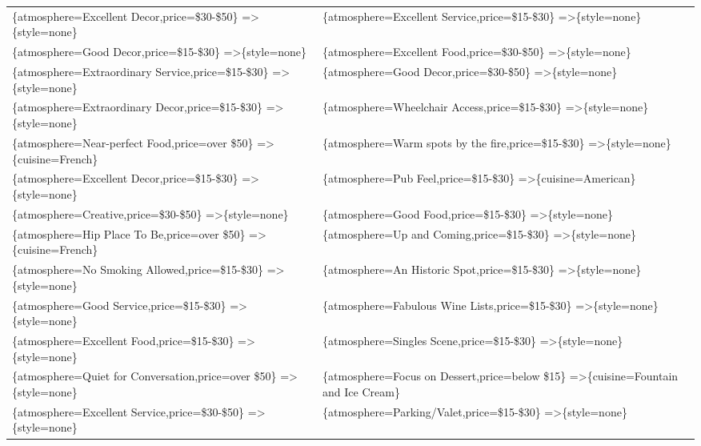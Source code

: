 \documentclass[letterpaper,10pt]{article}
\begin{document}
\begin{appendices}
\begin{table}[h]
\begin{adjustbox}{max width=\textwidth}
\begin{tabular}{ll}
\{atmosphere=Excellent Decor,price=\$30-\$50\} =\textgreater \{style=none\} & \{atmosphere=Excellent Service,price=\$15-\$30\} =\textgreater \{style=none\} \\ 
\{atmosphere=Good Decor,price=\$15-\$30\} =\textgreater \{style=none\} & \{atmosphere=Excellent Food,price=\$30-\$50\} =\textgreater \{style=none\} \\ 
\{atmosphere=Extraordinary Service,price=\$15-\$30\} =\textgreater \{style=none\} & \{atmosphere=Good Decor,price=\$30-\$50\} =\textgreater \{style=none\} \\ 
\{atmosphere=Extraordinary Decor,price=\$15-\$30\} =\textgreater \{style=none\} & \{atmosphere=Wheelchair Access,price=\$15-\$30\} =\textgreater \{style=none\} \\ 
\{atmosphere=Near-perfect Food,price=over \$50\} =\textgreater \{cuisine=French\} & \{atmosphere=Warm spots by the fire,price=\$15-\$30\} =\textgreater \{style=none\} \\ 
\{atmosphere=Excellent Decor,price=\$15-\$30\} =\textgreater \{style=none\} & \{atmosphere=Pub Feel,price=\$15-\$30\} =\textgreater \{cuisine=American\} \\ 
\{atmosphere=Creative,price=\$30-\$50\} =\textgreater \{style=none\} & \{atmosphere=Good Food,price=\$15-\$30\} =\textgreater \{style=none\} \\ 
\{atmosphere=Hip Place To Be,price=over \$50\} =\textgreater \{cuisine=French\} & \{atmosphere=Up and Coming,price=\$15-\$30\} =\textgreater \{style=none\} \\ 
\{atmosphere=No Smoking Allowed,price=\$15-\$30\} =\textgreater \{style=none\} & \{atmosphere=An Historic Spot,price=\$15-\$30\} =\textgreater \{style=none\} \\ 
\{atmosphere=Good Service,price=\$15-\$30\} =\textgreater \{style=none\} & \{atmosphere=Fabulous Wine Lists,price=\$15-\$30\} =\textgreater \{style=none\} \\ 
\{atmosphere=Excellent Food,price=\$15-\$30\} =\textgreater \{style=none\} & \{atmosphere=Singles Scene,price=\$15-\$30\} =\textgreater \{style=none\} \\ 
\{atmosphere=Quiet for Conversation,price=over \$50\} =\textgreater \{style=none\} & \{atmosphere=Focus on Dessert,price=below \$15\} =\textgreater \{cuisine=Fountain and Ice Cream\} \\ 
\{atmosphere=Excellent Service,price=\$30-\$50\} =\textgreater \{style=none\} & \{atmosphere=Parking/Valet,price=\$15-\$30\} =\textgreater \{style=none\} \\ 

\end{tabular}
\end{adjustbox}
\end{table}
\end{appendices}
\end{document}
